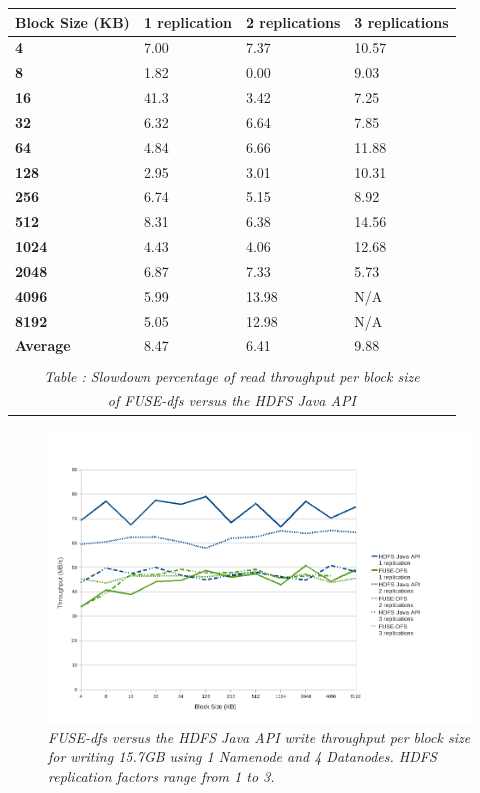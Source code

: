 \documentclass[11]{article}
\begin{document}
\begin{center}
\begin{tabular}[tbp]{| l | l | l | l |}

\hline
\textbf{Block Size (KB)}& \textbf{1 replication} & \textbf{2 replications} &	\textbf{3 replications}	\\
\hline
\hline
\textbf{4}	&	7.00	&	7.37	&	10.57\\
\textbf{8}	&	1.82	&	0.00	&	9.03\\
\textbf{16}	&	41.3	&	3.42	&	7.25\\
\textbf{32}	&	6.32	&	6.64	&	7.85\\
\textbf{64}	&	4.84	&	6.66	&	11.88\\
\textbf{128}	&	2.95	&	3.01	&	10.31\\
\textbf{256}	&	6.74	&	5.15	&	8.92\\
\textbf{512}	&	8.31	&	6.38	&	14.56\\
\textbf{1024}	&	4.43	&	4.06	&	12.68\\
\textbf{2048}	&	6.87	&	7.33	&	5.73\\
\textbf{4096}	&	5.99	&	13.98&	N/A\\
\textbf{8192}	&	5.05	&	12.98&	N/A\\
\hline
\hline
\textbf{Average}	&	8.47	&	6.41	&	9.88\\
\hline
\multicolumn{4}{c}{\hfill}\\
\multicolumn{4}{c}{\emph{Table : Slowdown percentage of \textit{read} throughput per block size }}\\
\multicolumn{4}{c}{\emph{of FUSE-dfs versus the HDFS Java API}}\\
\end{tabular}
\end{center}



\begin{figure}
 \centering
 \includegraphics[totalheight=.25\textheight,
width=.75\textwidth,bb=0 0 985 682, scale=0.50]{images/WriteThroughput-4Datanodes-Line.png}
 \caption{\emph{FUSE-dfs versus the HDFS Java API \textit{write} throughput per block size 
for writing 15.7GB using \textit{1 Namenode} and \textit{4 Datanodes}. HDFS replication factors range from 1 to 3.}}
\end{figure}
\end{document}
